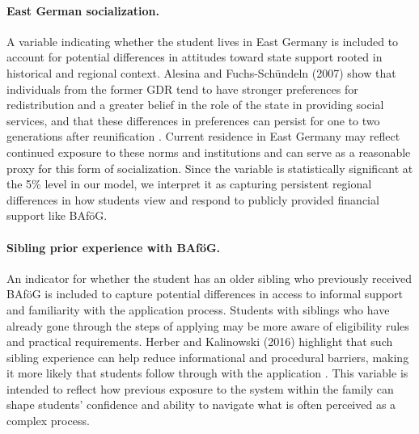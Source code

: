 \paragraph{East German socialization.}  A variable indicating whether the student lives in East Germany is included to account for potential differences in attitudes toward state support rooted in historical and regional context. Alesina and Fuchs-Schündeln (2007) show that individuals from the former GDR tend to have stronger preferences for redistribution and a greater belief in the role of the state in providing social services, and that these differences in preferences can persist for one to two generations after reunification \citep{alesina_good-bye_2007}. Current residence in East Germany may reflect continued exposure to these norms and institutions and can serve as a reasonable proxy for this form of socialization. Since the variable is statistically significant at the 5\% level in our model, we interpret it as capturing persistent regional differences in how students view and respond to publicly provided financial support like BAföG.

\paragraph{Sibling prior experience with BAföG.} An indicator for whether the student has an older sibling who previously received BAföG is included to capture potential differences in access to informal support and familiarity with the application process. Students with siblings who have already gone through the steps of applying may be more aware of eligibility rules and practical requirements. Herber and Kalinowski (2016) highlight that such sibling experience can help reduce informational and procedural barriers, making it more likely that students follow through with the application \citep{herber_non-take-up_2019}. This variable is intended to reflect how previous exposure to the system within the family can shape students’ confidence and ability to navigate what is often perceived as a complex process.

